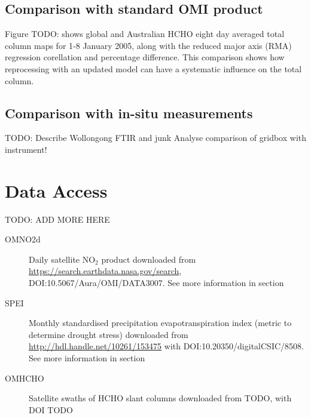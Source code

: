     
  \subsection{Comparison with standard OMI product}
    Figure TODO: shows global and Australian HCHO eight day averaged total column maps for 1-8 January 2005, along with the reduced major axis (RMA) regression corellation and percentage difference.
    This comparison shows how reprocessing with an updated model can have a systematic influence on the total column.
    
  \subsection{Comparison with in-situ measurements}
    TODO: Describe Wollongong FTIR and junk
    Analyse comparison of gridbox with instrument!
     
\section{Data Access}
TODO: ADD MORE HERE
\label{Model:DataAccess}
\begin{description}
  \item[OMNO2d] Daily satellite NO$_2$ product downloaded from \url{https://search.earthdata.nasa.gov/search}, DOI:10.5067/Aura/OMI/DATA3007. 
  See more information in section %
  
  \item[SPEI] Monthly standardised precipitation evapotranspiration index (metric to determine drought stress) downloaded from \url{http://hdl.handle.net/10261/153475} with DOI:10.20350/digitalCSIC/8508.
  See more information in section %
  
  \item[OMHCHO] Satellite swaths of HCHO slant columns downloaded from TODO, with DOI TODO
  
\end{description}